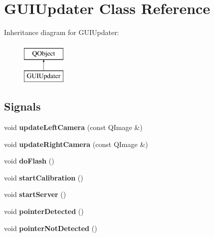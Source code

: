 \hypertarget{class_g_u_i_updater}{}\section{G\+U\+I\+Updater Class Reference}
\label{class_g_u_i_updater}
Inheritance diagram for G\+U\+I\+Updater\+:\begin{figure}[H]
\begin{center}
\leavevmode
\includegraphics[height=2.000000cm]{class_g_u_i_updater}
\end{center}
\end{figure}
\subsection*{Signals}
\begin{DoxyCompactItemize}
\item 
void {\bfseries update\+Left\+Camera} (const Q\+Image \&)\hypertarget{class_g_u_i_updater_afacf05ece0988f07662eaab5591fd8b7}{}\label{class_g_u_i_updater_afacf05ece0988f07662eaab5591fd8b7}

\item 
void {\bfseries update\+Right\+Camera} (const Q\+Image \&)\hypertarget{class_g_u_i_updater_a1590223624b4a314a9fe56db73d984ab}{}\label{class_g_u_i_updater_a1590223624b4a314a9fe56db73d984ab}

\item 
void {\bfseries do\+Flash} ()\hypertarget{class_g_u_i_updater_ad8113ad71fe2b1cd68b11bf69fc04f95}{}\label{class_g_u_i_updater_ad8113ad71fe2b1cd68b11bf69fc04f95}

\item 
void {\bfseries start\+Calibration} ()\hypertarget{class_g_u_i_updater_a1ab6dfde2b8ea0700d212def0670ab9b}{}\label{class_g_u_i_updater_a1ab6dfde2b8ea0700d212def0670ab9b}

\item 
void {\bfseries start\+Server} ()\hypertarget{class_g_u_i_updater_acc51b4ad134d5972231c4815d6148b83}{}\label{class_g_u_i_updater_acc51b4ad134d5972231c4815d6148b83}

\item 
void {\bfseries pointer\+Detected} ()\hypertarget{class_g_u_i_updater_af4c1cc78e23aa37ff6766be12f45b75f}{}\label{class_g_u_i_updater_af4c1cc78e23aa37ff6766be12f45b75f}

\item 
void {\bfseries pointer\+Not\+Detected} ()\hypertarget{class_g_u_i_updater_a25d97041202cd55c22064b99bddefc5f}{}\label{class_g_u_i_updater_a25d97041202cd55c22064b99bddefc5f}

\end{DoxyCompactItemize}
